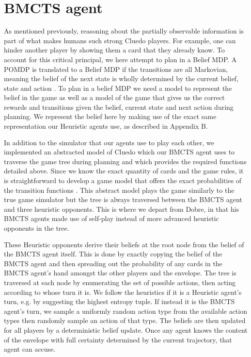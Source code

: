 \documentclass[msc, ai, twoside, notimes, logo, parskip, leftchapter, normalheadings]{infthesis}
\begin{document}
\section{BMCTS agent}
As mentioned previously, reasoning about the partially observable information is part of what makes humans such strong Cluedo players. For example, one can hinder another player by showing them a card that they already know. To account for this critical principal, we here attempt to plan in a Belief MDP. A POMDP is translated to a Belief MDP if the transitions are all Markovian, meaning the belief of the next state is wholly determined by the current belief, state and action \citep{Mihai}. To plan in a belief MDP we need a model to represent the belief in the game as well as a model of the game that gives us the correct rewards and transitions given the belief, current state and next action during planning. We represent the belief here by making use of the exact same representation our Heuristic agents use, as described in Appendix B. 

In addition to the simulator that our agents use to play each other, we implemented an abstracted model of Cluedo which our BMCTS agent uses to traverse the game tree during planning and which provides the required functions detailed above. Since we know the exact quantity of cards and the game rules, it is straightforward to develop a game model that offers the exact probabilities of the transition functions \citep{Mihai}. This abstract model plays the game similarly to the true game simulator but the tree is always traversed between the BMCTS agent and three heuristic opponents. This is where we depart from Dobre, in that his BMCTS agents made use of self-play instead of more advanced heuristic opponents in the tree. 

These Heuristic opponents derive their beliefs at the root node from the belief of the BMCTS agent itself. This is done by exactly copying the belief of the BMCTS agent and then spreading out the probability of any cards in the BMCTS agent's hand amongst the other players and the envelope. The tree is traversed at each node by enumerating the set of possible actions, then acting according to whose turn it is. We follow the heuristics if it is a Heuristic agent's turn, e.g. by suggesting the highest entropy tuple. If instead it is the BMCTS agent's turn, we sample a uniformly random action type from the available action types then randomly sample an action of that type. The beliefs are then updated for all players by a deterministic belief update. Once any agent knows the content of the envelope with full certainty determined by the current trajectory, that agent can accuse. 
\end{document}
